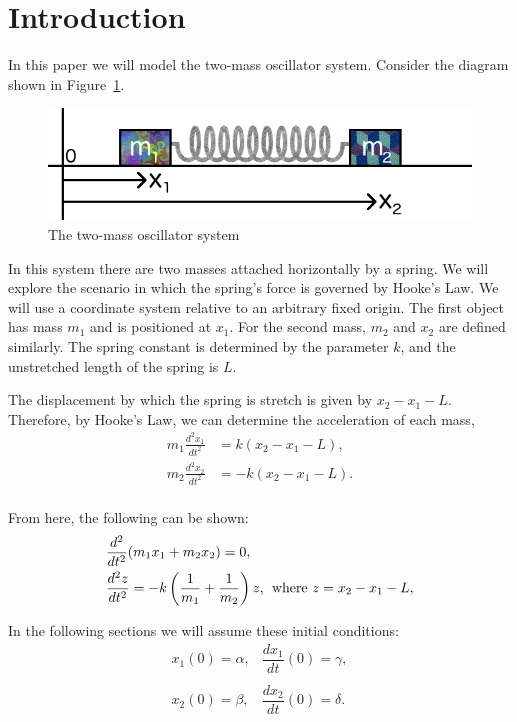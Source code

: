 \documentclass[11pt, oneside]{article}   	%
\begin{document}
\section{Introduction}
In this paper we will model the two-mass oscillator system.
Consider the diagram shown in Figure~\ref{sketch}.

\begin{figure}[h!]
\centering \includegraphics[scale=0.7]{sketch}
\caption{\label{sketch} The two-mass oscillator system}
\end{figure}

In this system there are two masses attached horizontally by a spring.
We will explore the scenario in which the spring's force is governed by Hooke's Law.
We will use a coordinate system relative to an arbitrary fixed origin.
The first object has mass $m_1$ and is positioned at $x_1$.
For the second mass, $m_2$ and $x_2$ are defined similarly.
The spring constant is determined by the parameter $k$, and the unstretched length of the spring is $L$.

The displacement by which the spring is stretch is given by $x_2 - x_1 -L$.
Therefore, by Hooke's Law, we can determine the acceleration of each mass,
\begin{align*}
m_1 \frac{d^2x_1}{dt^2} &= k(x_2 - x_1 - L), \\
m_2 \frac{d^2x_2}{dt^2} &= -k(x_2 - x_1 - L). \\
\end{align*}

From here, the following can be shown:
\begin{align}
&\frac{d^2}{dt^2}(m_1x_1 + m_2x_2) = 0, \label{eq:1}\\
&\frac{d^2z}{dt^2} = -k\left(\frac{1}{m_1}+\frac{1}{m_2}\right)z \text{, \;where } z = x_2-x_1-L, \label{eq:2}
\end{align}

In the following sections we will assume these initial conditions:
$$\begin{matrix}
x_1(0) = \alpha, & \dfrac{dx_1}{dt}(0) = \gamma, \\ &\\
x_2(0) = \beta, & \dfrac{dx_2}{dt}(0) = \delta.
\end{matrix}$$
\end{document}
